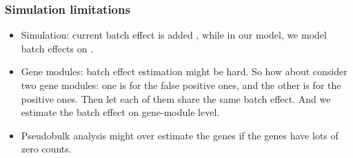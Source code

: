 \begin{frame}
  \frametitle{Simulation limitations}
  \begin{itemize}
  \item
    Simulation: current batch effect is added , while in
    our model, we model batch effects on .
  \item
    Gene modules: batch effect estimation might be hard. So how about consider
    two gene modules: one is for the false positive ones, and the other is for
    the positive ones. Then let each of them share the same batch effect. And we
    estimate the batch effect on gene-module level.
  \item
    Pseudobulk analysis might over estimate the genes if the genes have lots of zero
    counts.
  \end{itemize}
\end{frame}
